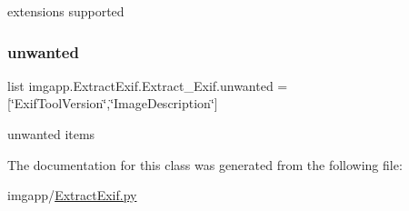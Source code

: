 extensions supported 

\mbox{\label{classimgapp_1_1ExtractExif_1_1Extract__Exif_a5d96b6e5f57d4975b703d785b32428e0}} 
\subsubsection{\texorpdfstring{unwanted}{unwanted}}
{\footnotesize\ttfamily list imgapp.\+Extract\+Exif.\+Extract\+\_\+\+Exif.\+unwanted = \mbox{[}\char`\"{}Exif\+Tool\+Version\char`\"{},\char`\"{}Image\+Description\char`\"{}\mbox{]}\hspace{0.3cm}{\ttfamily [static]}}



unwanted items 



The documentation for this class was generated from the following file\+:\begin{DoxyCompactItemize}
\item 
imgapp/\hyperlink{ExtractExif_8py}{Extract\+Exif.\+py}\end{DoxyCompactItemize}
